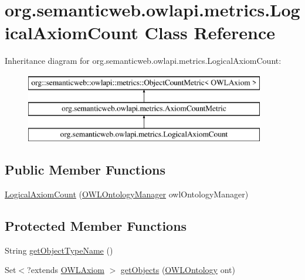 \hypertarget{classorg_1_1semanticweb_1_1owlapi_1_1metrics_1_1_logical_axiom_count}{\section{org.\-semanticweb.\-owlapi.\-metrics.\-Logical\-Axiom\-Count Class Reference}
\label{classorg_1_1semanticweb_1_1owlapi_1_1metrics_1_1_logical_axiom_count}
}
Inheritance diagram for org.\-semanticweb.\-owlapi.\-metrics.\-Logical\-Axiom\-Count\-:\begin{figure}[H]
\begin{center}
\leavevmode
\includegraphics[height=3.000000cm]{classorg_1_1semanticweb_1_1owlapi_1_1metrics_1_1_logical_axiom_count}
\end{center}
\end{figure}
\subsection*{Public Member Functions}
\begin{DoxyCompactItemize}
\item 
\hyperlink{classorg_1_1semanticweb_1_1owlapi_1_1metrics_1_1_logical_axiom_count_a28219249f91d1dd77d5ab577659cbb4f}{Logical\-Axiom\-Count} (\hyperlink{interfaceorg_1_1semanticweb_1_1owlapi_1_1model_1_1_o_w_l_ontology_manager}{O\-W\-L\-Ontology\-Manager} owl\-Ontology\-Manager)
\end{DoxyCompactItemize}
\subsection*{Protected Member Functions}
\begin{DoxyCompactItemize}
\item 
String \hyperlink{classorg_1_1semanticweb_1_1owlapi_1_1metrics_1_1_logical_axiom_count_a9ee68fa10af8f7ffa47f34386e2faaa4}{get\-Object\-Type\-Name} ()
\item 
Set$<$?extends \hyperlink{interfaceorg_1_1semanticweb_1_1owlapi_1_1model_1_1_o_w_l_axiom}{O\-W\-L\-Axiom} $>$ \hyperlink{classorg_1_1semanticweb_1_1owlapi_1_1metrics_1_1_logical_axiom_count_a326d05138ce39613c455a10575ee6cc4}{get\-Objects} (\hyperlink{interfaceorg_1_1semanticweb_1_1owlapi_1_1model_1_1_o_w_l_ontology}{O\-W\-L\-Ontology} ont)
\end{DoxyCompactItemize}


